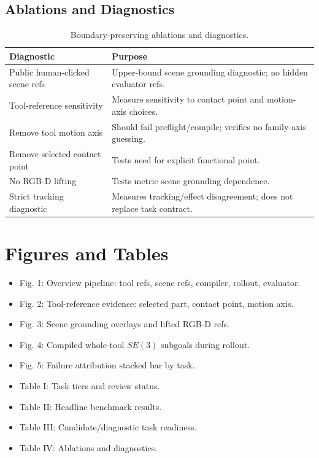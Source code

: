 \documentclass[journal]{IEEEtran}
\begin{document}
\subsection{Ablations and Diagnostics}
\begin{table}[h]
\centering
\caption{Boundary-preserving ablations and diagnostics.}
\begin{tabular}{p{}p{}}
\toprule
Diagnostic & Purpose \\
\midrule
Public human-clicked scene refs & Upper-bound scene grounding diagnostic; no hidden evaluator refs. \\
Tool-reference sensitivity & Measure sensitivity to contact point and motion-axis choices. \\
Remove tool motion axis & Should fail preflight/compile; verifies no family-axis guessing. \\
Remove selected contact point & Tests need for explicit functional point. \\
No RGB-D lifting & Tests metric scene grounding dependence. \\
Strict tracking diagnostic & Measures tracking/effect disagreement; does not replace task contract. \\
\bottomrule
\end{tabular}
\end{table}

\section{Figures and Tables}
\begin{itemize}
  \item Fig. 1: Overview pipeline: tool refs, scene refs, compiler, rollout,
  evaluator.
  \item Fig. 2: Tool-reference evidence: selected part, contact point, motion
  axis.
  \item Fig. 3: Scene grounding overlays and lifted RGB-D refs.
  \item Fig. 4: Compiled whole-tool $SE(3)$ subgoals during rollout.
  \item Fig. 5: Failure attribution stacked bar by task.
  \item Table I: Task tiers and review status.
  \item Table II: Headline benchmark results.
  \item Table III: Candidate/diagnostic task readiness.
  \item Table IV: Ablations and diagnostics.
\end{itemize}
\end{document}
